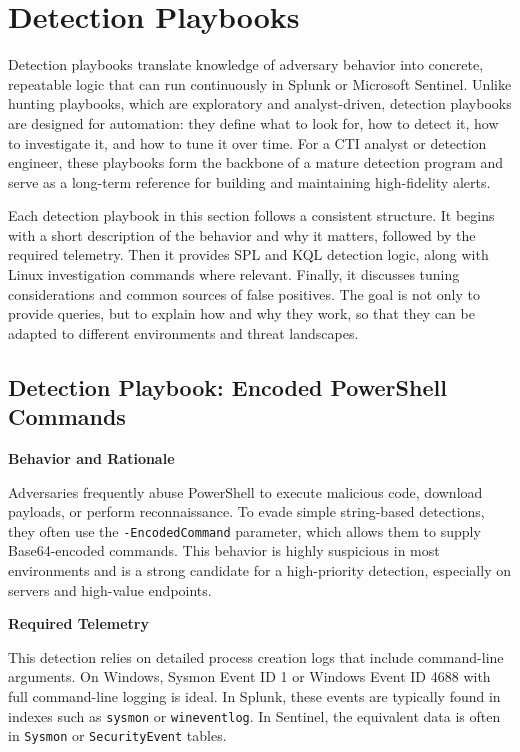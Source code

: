 \section{Detection Playbooks}

Detection playbooks translate knowledge of adversary behavior into concrete, repeatable logic that can run continuously in Splunk 
or Microsoft Sentinel. Unlike hunting playbooks, which are exploratory and analyst-driven, detection playbooks are designed for 
automation: they define what to look for, how to detect it, how to investigate it, and how to tune it over time. For a CTI analyst 
or detection engineer, these playbooks form the backbone of a mature detection program and serve as a long-term reference for 
building and maintaining high-fidelity alerts.

Each detection playbook in this section follows a consistent structure. It begins with a short description of the behavior and 
why it matters, followed by the required telemetry. Then it provides SPL and KQL detection logic, along with Linux investigation 
commands where relevant. Finally, it discusses tuning considerations and common sources of false positives. The goal is not only 
to provide queries, but to explain how and why they work, so that they can be adapted to different environments and threat landscapes.

\subsection*{Detection Playbook: Encoded PowerShell Commands}

\textbf{Behavior and Rationale}

Adversaries frequently abuse PowerShell to execute malicious code, download payloads, or perform reconnaissance. 
To evade simple string-based detections, they often use the \texttt{-EncodedCommand} parameter, which allows them to 
supply Base64-encoded commands. This behavior is highly suspicious in most environments and is a strong candidate for 
a high-priority detection, especially on servers and high-value endpoints.

\textbf{Required Telemetry}

This detection relies on detailed process creation logs that include command-line arguments. On Windows, Sysmon Event ID 1 or 
Windows Event ID 4688 with full command-line logging is ideal. In Splunk, these events are typically found in indexes such as 
\texttt{sysmon} or \texttt{wineventlog}. In Sentinel, the equivalent data is often in \texttt{Sysmon} or \texttt{SecurityEvent} tables.

